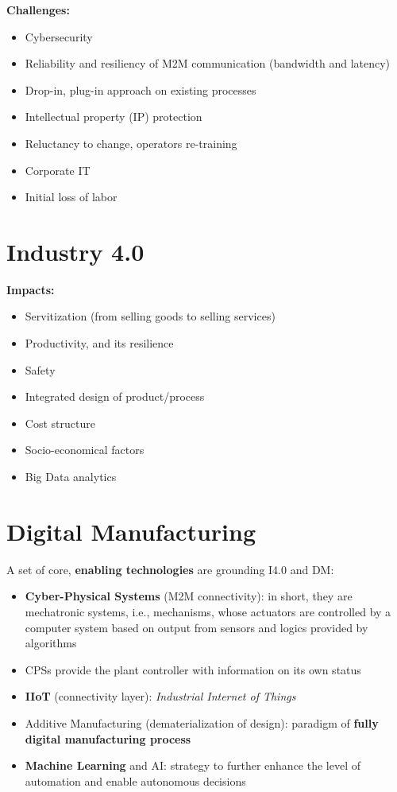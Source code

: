 \documentclass[
  letterpaper,
  DIV=11,
  numbers=noendperiod]{scrartcl}
\providecommand{\tightlist}{%
  \setlength{\itemsep}{0pt}\setlength{\parskip}{0pt}}
\begin{document}
\textbf{Challenges:}

\begin{itemize}
\tightlist
\item
  Cybersecurity
\item
  Reliability and resiliency of M2M communication (bandwidth and
  latency)
\item
  Drop-in, plug-in approach on existing processes
\item
  Intellectual property (IP) protection
\item
  Reluctancy to change, operators re-training
\item
  Corporate IT
\item
  Initial loss of labor
\end{itemize}

\section{Industry 4.0}\label{industry-4.0-5}

\textbf{Impacts:}

\begin{itemize}
\tightlist
\item
  Servitization (from selling goods to selling services)
\item
  Productivity, and its resilience
\item
  Safety
\item
  Integrated design of product/process
\item
  Cost structure
\item
  Socio-economical factors
\item
  Big Data analytics
\end{itemize}

\section{Digital Manufacturing}\label{digital-manufacturing-1}

A set of core, \textbf{enabling technologies} are grounding I4.0 and DM:

\begin{itemize}
\tightlist
\item
  \textbf{Cyber-Physical Systems} (M2M connectivity): in short, they are
  mechatronic systems, i.e., mechanisms, whose actuators are controlled
  by a computer system based on output from sensors and logics provided
  by algorithms
\item
  CPSs provide the plant controller with information on its own status
\item
  \textbf{IIoT} (connectivity layer): \emph{Industrial Internet of
  Things}
\item
  Additive Manufacturing (dematerialization of design): paradigm of
  \textbf{fully digital manufacturing process}
\item
  \textbf{Machine Learning} and AI: strategy to further enhance the
  level of automation and enable autonomous decisions
\end{itemize}
\end{document}
